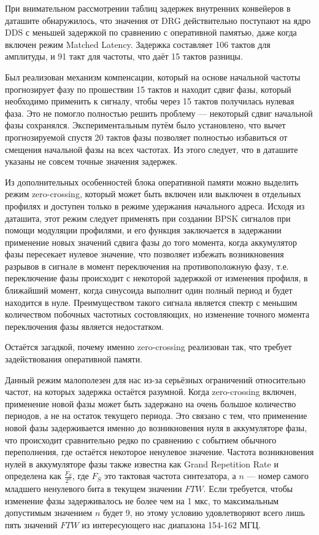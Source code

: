 \documentclass[rusmathsym, eqnumwithinsec, amspack, hyperref]{bomgost}
\begin{document}
При внимательном рассмотрении таблиц задержек внутренних конвейеров в даташите обнаружилось, что значения от DRG действительно поступают на ядро DDS с меньшей задержкой по сравнению с оперативной памятью, даже когда включен режим Matched Latency. Задержка составляет 106 тактов для амплитуды, и 91 такт для частоты, что даёт 15 тактов разницы.

Был реализован механизм компенсации, который на основе начальной частоты прогнозирует фазу по прошествии 15 тактов и находит сдвиг фазы, который необходимо применить к сигналу, чтобы через 15 тактов получилась нулевая фаза. Это не помогло полностью решить проблему --- некоторый сдвиг начальной фазы сохранялся. Экспериментальным путём было установлено, что вычет прогнозируемой спустя 20 тактов фазы позволяет полностью избавиться от смещения начальной фазы на всех частотах. Из этого следует, что в даташите указаны не совсем точные значения задержек.

Из дополнительных особенностей блока оперативной памяти можно выделить режим zero-crossing, который может быть включен или выключен в отдельных профилях и доступен только в режиме удержания начального адреса. Исходя из даташита, этот режим следует применять при создании BPSK сигналов при помощи модуляции профилями, и его функция заключается в задержании применение новых значений сдвига фазы до того момента, когда аккумулятор фазы пересекает нулевое значение, что позволяет избежать возникновения разрывов в сигнале в момент переключения на противоположную фазу, т.е. переключение фазы происходит с некоторой задержкой от изменения профиля, в ближайший момент, когда синусоида выполнит один полный период и будет находится в нуле. Преимуществом такого сигнала является спектр с меньшим количеством побочных частотных состовляющих, но изменение точного момента переключения фазы является недостатком.

Остаётся загадкой, почему именно zero-crossing реализован так, что требует задействования оперативной памяти.

Данный режим малополезен для нас из-за серьёзных ограничений относительно частот, на которых задержка остаётся разумной. Когда zero-crossing включен, применение новой фазы может быть задержано на очень большое количество периодов, а не на остаток текущего периода. Это связано с тем, что применение новой фазы задерживается именно до возникновения нуля в аккумуляторе фазы, что происходит сравнительно редко по сравнению с событием обычного переполнения, где остаётся некоторое ненулевое значение. Частота возникновения нулей в аккумуляторе фазы также известна как Grand Repetition Rate и определена как $\frac{F_S}{2^n}$, где $F_S$ это тактовая частота синтезатора, а $n$ --- номер самого младшего ненулевого бита в текущем значении $FTW$. Если требуется, чтобы изменение фазы задерживалось не более чем на 1 мкс, то максимальным допустимым значением $n$ будет 9, но этому условию удовлетворяют всего лишь пять значений $FTW$ из интересующего нас диапазона 154-162 МГЦ.
\end{document}
